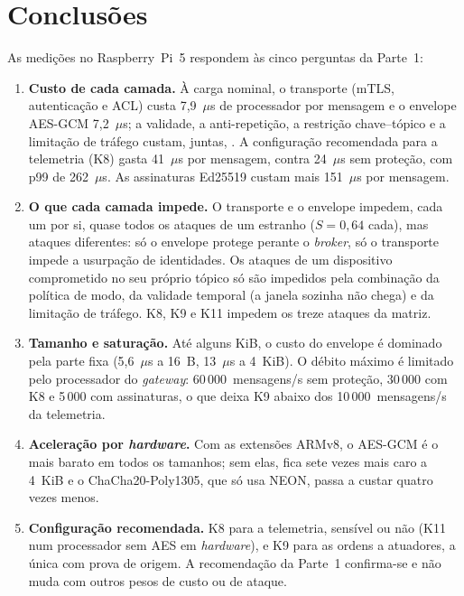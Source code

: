 \section{Conclusões}
\label{sec:conclusoes}

As medições no Raspberry~Pi~5 respondem às cinco perguntas da Parte~1:

\begin{enumerate}[label=\textbf{QP\arabic*.}, leftmargin=*]
  \item \textbf{Custo de cada camada.} À carga nominal, o transporte (mTLS,
    autenticação e ACL) custa 7,9~$\mu$s de processador por mensagem e o envelope
    AES-GCM 7,2~$\mu$s; a validade, a anti-repetição, a restrição chave--tópico e
    a limitação de tráfego custam, juntas, . A configuração
    recomendada para a telemetria (K8) gasta 41~$\mu$s por mensagem, contra
    24~$\mu$s sem proteção, com p99 de 262~$\mu$s. As assinaturas Ed25519 custam
    mais 151~$\mu$s por mensagem.
  \item \textbf{O que cada camada impede.} O transporte e o envelope impedem, cada
    um por si, quase todos os ataques de um estranho ($S = 0{,}64$ cada), mas
    ataques diferentes: só o envelope protege perante o \emph{broker}, só o
    transporte impede a usurpação de identidades. Os ataques de um dispositivo
    comprometido no seu próprio tópico só são impedidos pela combinação da
    política de modo, da validade temporal (a janela sozinha não chega) e da
    limitação de tráfego. K8, K9 e K11 impedem os treze ataques da matriz.
  \item \textbf{Tamanho e saturação.} Até alguns KiB, o custo do envelope é
    dominado pela parte fixa (5,6~$\mu$s a 16~B, 13~$\mu$s a 4~KiB). O débito
    máximo é limitado pelo processador do \emph{gateway}: 60\,000~mensagens/s sem
    proteção, 30\,000 com K8 e 5\,000 com assinaturas, o que deixa K9 abaixo dos
    10\,000~mensagens/s da telemetria.
  \item \textbf{Aceleração por \emph{hardware}.} Com as extensões ARMv8, o AES-GCM
    é o mais barato em todos os tamanhos; sem elas, fica sete vezes mais caro a
    4~KiB e o ChaCha20-Poly1305, que só usa NEON, passa a custar quatro vezes
    menos.
  \item \textbf{Configuração recomendada.} K8 para a telemetria, sensível ou não
    (K11 num processador sem AES em \emph{hardware}), e K9 para as ordens a
    atuadores, a única com prova de origem. A recomendação da Parte~1 confirma-se
    e não muda com outros pesos de custo ou de ataque.
\end{enumerate}

